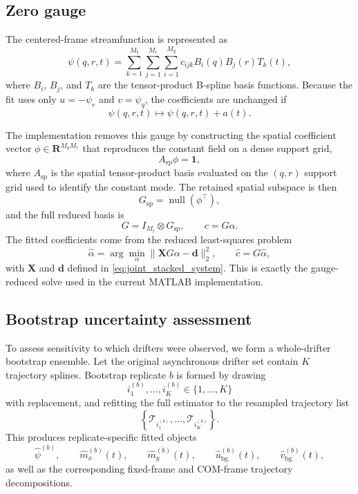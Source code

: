 \documentclass{article}
\begin{document}
\subsection{Zero gauge}

 The centered-frame streamfunction is represented as
 \[
 \psi(q,r,t) = \sum_{k=1}^{M_t} \sum_{j=1}^{M_r} \sum_{i=1}^{M_q}
 c_{ijk} B_i(q) B_j(r) T_k(t),
 \]
 where $B_i$, $B_j$, and $T_k$ are the tensor-product B-spline
 basis functions. Because the fit uses only $u = -\psi_r$ and
 $v = \psi_q$, the coefficients are unchanged if
 \[
 \psi(q,r,t) \mapsto \psi(q,r,t) + a(t).
 \]

 The implementation removes this gauge by constructing the spatial
 coefficient vector $\phi \in \mathbf{R}^{M_q M_r}$ that reproduces
 the constant field on a dense support grid,
\[
 A_{\mathrm{sp}} \phi = \mathbf{1},
 \]
 where $A_{\mathrm{sp}}$ is the spatial tensor-product basis evaluated
 on the $(q,r)$ support grid used to identify the constant mode.
 The retained spatial subspace is then
\[
 G_{\mathrm{sp}} = \operatorname{null}(\phi^\top),
 \]
 and the full reduced basis is
\[
 G = I_{M_t} \otimes G_{\mathrm{sp}},
 \qquad
 c = G \alpha.
 \]
 The fitted coefficients come from the reduced least-squares problem
\[
\hat{\alpha} = \arg\min_{\alpha} \|\mathbf{X} G \alpha - \mathbf{d}\|_2^2,
\qquad
\hat{c} = G \hat{\alpha},
\]
with $\mathbf{X}$ and $\mathbf{d}$ defined in
\eqref{eq:joint_stacked_system}. This is exactly the gauge-reduced solve
 used in the current MATLAB implementation.

\subsection{Bootstrap uncertainty assessment}

To assess sensitivity to which drifters were observed, we form a
whole-drifter bootstrap ensemble. Let the original asynchronous drifter
set contain $K$ trajectory splines. Bootstrap replicate $b$ is formed by
drawing
\begin{equation}
i_1^{(b)}, \dots, i_K^{(b)} \in \{1,\dots,K\}
\end{equation}
with replacement, and refitting the full estimator to the resampled
trajectory list
\begin{equation}
\left\{\mathcal{T}_{i_1^{(b)}}, \dots, \mathcal{T}_{i_K^{(b)}}\right\}.
\end{equation}
This produces replicate-specific fitted objects
\begin{equation}
\hat{\psi}^{(b)}, \qquad \hat{m}_x^{(b)}(t), \qquad \hat{m}_y^{(b)}(t),
\qquad \hat{u}_{\mathrm{bg}}^{(b)}(t), \qquad \hat{v}_{\mathrm{bg}}^{(b)}(t),
\end{equation}
as well as the corresponding fixed-frame and COM-frame trajectory
decompositions.
\end{document}

